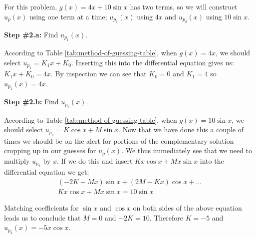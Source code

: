 \vspace{0.25cm}

\noindent For this problem, $g(x) = 4x+10\sin{x}$ has two terms, so we will construct $u_p(x)$ using one term at a time; $u_{p_1}(x)$ using $4x$ and $u_{p_2}(x)$ using $10\sin{x}$.  

\vspace{0.25cm}

\noindent\textbf{Step \#2.a:} Find $u_{p_1}(x)$.

\vspace{0.25cm}

\noindent According to Table \ref{tab:method-of-guessing-table}, when $g(x)=4x$, we should select $u_{p_1} = K_1x+K_0$.  Inserting this into the differential equation gives us: $K_1x + K_0 = 4x$.  By inspection we can see that $K_0 = 0$ and $K_1 = 4$ so $u_{p_1}(x) = 4x$.  

\vspace{0.25cm}

\noindent\textbf{Step \#2.b: } Find $u_{p_2}(x)$.

\vspace{0.25cm}

\noindent According to Table \ref{tab:method-of-guessing-table}, when $g(x)=10\sin{x}$, we should select $u_{p_2} =  K\cos{x}+M\sin{x}$. Now that we have done this a couple of times we should be on the alert for portions of the complementary solution cropping up in our guesses for $u_p(x)$. We thus immediately see that we need to multiply $u_{p_2}$ by $x$.  If we do this and insert $Kx\cos{x}+Mx\sin{x}$ into the differential equation we get:
\begin{multline*}
\left(-2K-Mx\right)\sin{x}+\left(2M-Kx\right)\cos{x} + \dots \\ Kx\cos{x}+Mx\sin{x} = 10\sin{x}
\end{multline*}

\vspace{0.20cm}

\noindent Matching coefficients for $\sin{x}$ and $\cos{x}$ on both sides of the above equation leads us to conclude that $M=0$ and $-2K = 10$.  Therefore $K = -5$ and $u_{p_2}(x)=-5x\cos{x}$.

